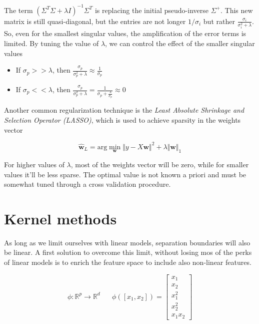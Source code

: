 \documentclass{article}
\numberwithin{equation}{subsection}
\begin{document}
The term $(\Sigma^T\Sigma + \lambda I)^{-1}\Sigma^T$ is replacing the initial pseudo-inverse $\Sigma^+$. This new matrix is still quasi-diagonal, but the entries are not longer $1/\sigma_i$ but rather $\frac{\sigma_i}{\sigma_i^2+\lambda}$. So, even for the smallest singular values, the amplification of the error terms is limited. By tuning the value of $\lambda$, we can control the effect of the smaller singular values

\begin{itemize}
    \item If $\sigma_p >> \lambda$, then $\frac{\sigma_p}{\sigma_p^2 + \lambda} \approx \frac{1}{\sigma_p}$
    \item If $\sigma_p << \lambda$, then $\frac{\sigma_p}{\sigma_p^2 + \lambda} = \frac{1}{\sigma_p + \frac{\lambda}{\sigma_p}} \approx 0$
\end{itemize}

Another common regularization technique is the \textit{Least Absolute Shrinkage and Selection Operator (LASSO)}, which is used to achieve sparsity in the weights vector

\begin{equation*}
    \hat{\textbf{w}}_L = \text{arg}\min_{\textbf{w}} \Vert y - X \textbf{w} \Vert^2 + \lambda \Vert \textbf{w} \Vert_1
\end{equation*}

For higher values of $\lambda$, most of the weights vector will be zero, while for smaller values it'll be less sparse. The optimal value is not known a priori and must be somewhat tuned through a cross validation procedure.

\section{Kernel methods}
As long as we limit ourselves with linear models, separation boundaries will also be linear. A first solution to overcome this limit, without losing mos of the perks of linear models is to enrich the feature space to include also non-linear features.

\begin{equation*}
    \phi : \mathbb{R}^p \to \mathbb{R}^d \;\;\;\;\;\; \phi([x_1,x_2]) = \begin{bmatrix}
    x_1 \\
    x_2 \\
    x_1^2 \\
    x_2^2 \\
    x_1 x_2
    \end{bmatrix}
\end{equation*}
\end{document}
